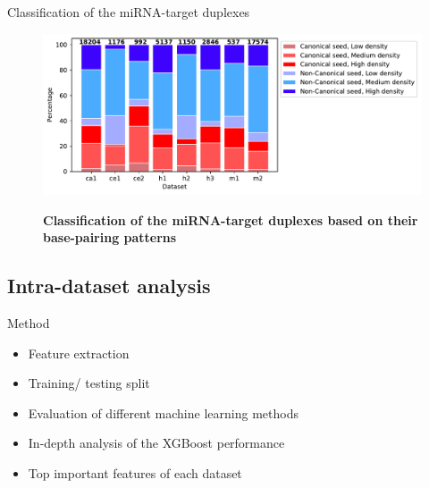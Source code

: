 \documentclass{beamer}
\begin{document}
\begin{frame}{Classification of the miRNA-target duplexes}
\begin{figure}[h!]
  \caption{\textbf{Classification of the miRNA-target duplexes based on their base-pairing patterns}} 
    \includegraphics[width = 1\textwidth]{images/2_seed_type_positive2.pdf}
      \label{fig:seed_type_pos}
     
      \end{figure}
\end{frame}
      

\subsection{Intra-dataset analysis}
\begin{frame}{Method}
\begin{itemize}
\item Feature extraction
\item Training/ testing split
\item Evaluation of different machine learning methods
\item In-depth analysis of the XGBoost performance
\item Top important features of each dataset
\end{itemize}
\end{frame}
\end{document}
